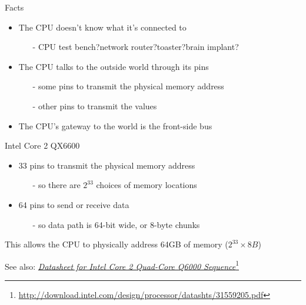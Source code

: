 \begin{frame}
  \begin{block}{Facts}
    \begin{itemize}
    \item The CPU doesn't know what it's connected to
      \begin{itemize}
      \item[-] CPU test bench?\quad{}network router?\quad{}toaster?\quad{}brain implant?
      \end{itemize}
    \item The CPU talks to the outside world through its pins
      \begin{itemize}
      \item[-] some pins to transmit the physical memory address
      \item[-] other pins to transmit the values
      \end{itemize}
    \item The CPU's gateway to the world is the front-side bus
    \end{itemize}
  \end{block}
  \begin{block}{Intel Core 2 QX6600}
    \begin{itemize}
    \item 33 pins to transmit the physical memory address
      \begin{itemize}
      \item[-] so there are $2^{33}$ choices of memory locations
      \end{itemize}
    \item 64 pins to send or receive data
      \begin{itemize}
      \item[-] so data path is 64-bit wide, or 8-byte chunks
      \end{itemize}
    \end{itemize}
    This allows the CPU to physically address 64GB of memory ($2^{33}\times{}8B$)
  \end{block}
\end{frame}

See also: \href{http://download.intel.com/design/processor/datashts/31559205.pdf}{\emph{Datasheet for Intel Core 2 Quad-Core Q6000
  Sequence}}\footnote{\url{http://download.intel.com/design/processor/datashts/31559205.pdf}}

